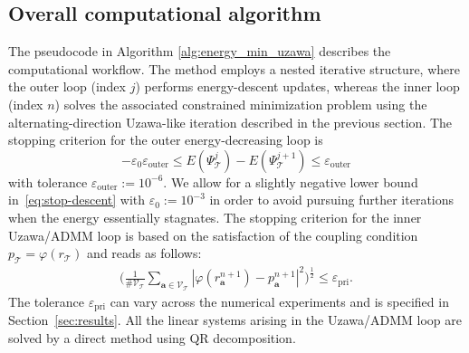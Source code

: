 \documentclass[a4paper,11pt]{article}
\theoremstyle{definition}
\theoremstyle{remark}
\numberwithin{equation}{section}
\newcommand{\disr}{r_\calT}
\newcommand{\disp}{p_\calT}
\newcommand{\ba}{{\boldsymbol a}}
\newcommand{\calT}{\mathcal{T}}
\newcommand{\calV}{\mathcal{V}}
\newcommand{\vertex}{\calV_\calT}
\begin{document}
\subsection{Overall computational algorithm}
The pseudocode in Algorithm \ref{alg:energy_min_uzawa}
describes the computational workflow. 
The method employs a nested iterative structure, where the outer loop (index $j$) performs energy-descent updates, whereas the inner loop (index $n$) solves the associated constrained minimization problem using the alternating-direction Uzawa-like iteration described in the previous section. The stopping criterion for the outer energy-decreasing loop is
\begin{equation} \label{eq:stop-descent}
-\varepsilon_0 \varepsilon_{\text{outer}}\leq E(\Psi^{j}_\calT)-E(\Psi^{j+1}_\calT) \leq  \varepsilon_{\text{outer}}
\end{equation} 
with tolerance $\varepsilon_{\text{outer}}:= 10^{-6}$. We allow for a slightly negative lower bound in~\eqref{eq:stop-descent} with $\varepsilon_0:=10^{-3}$ in order to avoid pursuing further iterations when the energy essentially stagnates.
The stopping criterion for the inner Uzawa/ADMM loop is based on the  satisfaction of the coupling condition $\disp=\varphi(\disr)$ and reads as follows: 
\begin{align}\label{equn: uzawa-tol}
\Bigg(\frac{1}{\#\vertex}\sum_{\ba\in  \vertex} |\varphi(r_\ba^{n+1}) - p_\ba^{n+1}|^2 \Bigg)^{\frac12}\leq \varepsilon_{\text{pri}}.
\end{align}
The tolerance $\varepsilon_{\text{pri}}$ can vary across the numerical experiments and is specified in Section~\ref{sec:results}. 
All the linear systems arising in the Uzawa/ADMM loop are solved by a direct method using QR decomposition.
\end{document}
